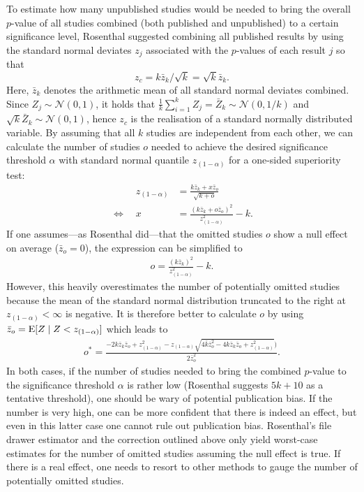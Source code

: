 To estimate how many unpublished studies would be needed to bring the overall $p$-value of all studies combined (both published and unpublished) to a certain significance level, Rosenthal suggested combining all published results by using the standard normal deviates $z_j$ associated with the $p$-values of each result $j$ so that $$z_c = k\bar{z}_k/\sqrt{k} = \sqrt{k}\bar{z}_k.$$
Here, $\bar{z}_k$ denotes the arithmetic mean of all standard normal deviates combined. Since ${Z_j \sim \mathcal{N}(0,1)}$, it holds that ${\frac{1}{k}\sum_{i=1}^k Z_j = \bar{Z}_k \sim \mathcal{N}(0,1/k)}$ and ${\sqrt{k}\bar{Z}_k \sim \mathcal{N}(0,1)}$, hence ${z_c}$ is the realisation of a standard normally distributed variable. By assuming that all $k$ studies are independent from each other, we can calculate the number of studies $o$ needed to achieve the desired significance threshold $\alpha$ with standard normal quantile $z_{(1-\alpha)}$ for a one-sided superiority test:
\begin{align*}
    \phantom{\Longleftrightarrow}\quad z_{(1-\alpha)} &= \frac{k\bar{z}_k + x\bar{z}_o}{\sqrt{k+o}}\\
    \Longleftrightarrow\quad x &= \frac{(k\bar{z}_k + o\bar{z}_o)^2}{z_{(1-\alpha)}^2}-k.
\end{align*}
If one assumes---as Rosenthal did---that the omitted studies $o$ show a null effect on average ($\bar{z}_o = 0$), the expression can be simplified to
\begin{align*}
    o = \frac{(k\bar{z}_k)^2}{z_{(1-\alpha)}^2}-k.
\end{align*}
However, this heavily overestimates the number of potentially omitted studies because the mean of the standard normal distribution truncated to the right at ${z_{(1-\alpha)} < \infty}$ is negative. It is therefore better to calculate $o$ by using ${\bar{z}_o = \operatorname{\text{E}}[Z \mid Z < z_{(1-\alpha)}]}$ which leads to
\begin{align*}
    o^*= \frac{-2k \bar{z}_k \bar{z}_o + z_{(1-\alpha)}^2 - 
    z_{(1-\alpha)}\sqrt{4\bar{k} \bar{z}_o^2 - 4k \bar{z}_k \bar{z}_o + z_{(1-\alpha)}^2})}{2\bar{z}_o^2}.
\end{align*}
In both cases, if the number of studies needed to bring the combined $p$-value to the significance threshold $\alpha$ is rather low (Rosenthal suggests ${5k + 10}$ as a tentative threshold), one should be wary of potential publication bias. If the number is very high, one can be more confident that there is indeed an effect, but even in this latter case one cannot rule out publication bias. Rosenthal's file drawer estimator and the correction outlined above only yield worst-case estimates for the number of omitted studies assuming the null effect is true. If there is a real effect, one needs to resort to other methods to gauge the number of potentially omitted studies.\par
